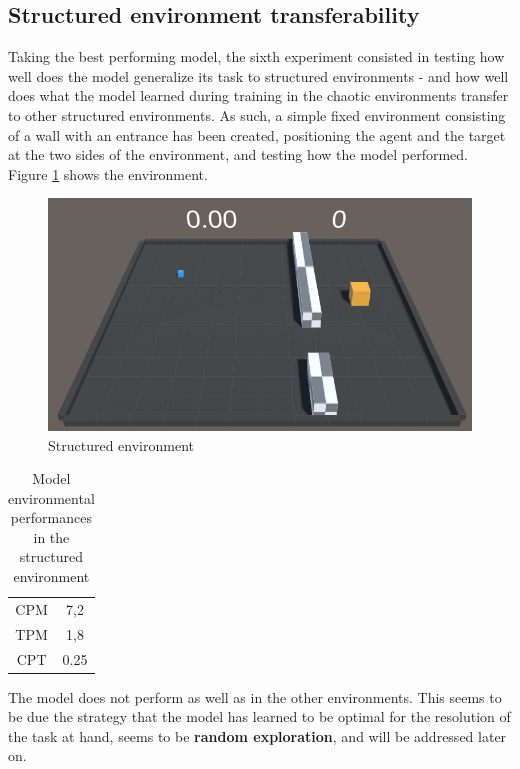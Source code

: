 \documentclass{ifacconf}
\begin{document}
\subsection{Structured environment transferability}
Taking the best performing model, the sixth experiment consisted in testing how well does the model generalize its task to structured environments - and how well does what the model learned during training in the chaotic environments transfer to other structured environments. As such, a simple fixed environment consisting of a wall with an entrance has been created, positioning the agent and the target at the two sides of the environment, and testing how the model performed. Figure \ref{fig:semistr} shows the environment.

\begin{figure}[!h]
\begin{center}
\includegraphics[width=\linewidth]{res/semistructured.png} 
\caption{Structured environment} 
\label{fig:semistr}
\end{center}
\end{figure}

\begin{table}[h]
\centering
\label{tab:curric}
\caption{Model environmental performances in the structured environment}
\begin{tabular}[t]{cc}
\hline
CPM&7,2\\
TPM&1,8\\
CPT&0.25\\
\hline
\end{tabular}
\end{table}%

The model does not perform as well as in the other environments. This seems to be due the strategy that the model has learned to be optimal for the resolution of the task at hand, seems to be \textbf{random exploration}, and will be addressed later on.
\end{document}
